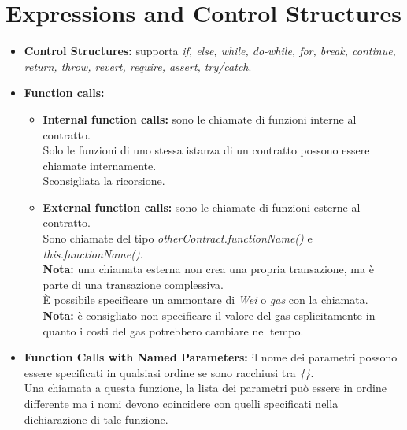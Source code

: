 \documentclass{article}
\begin{document}
            \section{Expressions and Control Structures}
                \begin{itemize}
                    \item \textbf{Control Structures:} supporta \textit{if, else, while, do-while, for, break, continue, return, throw, revert, require, assert, try/catch}.
                    
                    \item \textbf{Function calls:}
                        \begin{itemize}
                            \item \textbf{Internal function calls:} sono le chiamate di funzioni interne al contratto. \\
                            Solo le funzioni di uno stessa istanza di un contratto possono essere chiamate internamente. \\
                            Sconsigliata la ricorsione.

                            \item \textbf{External function calls:} sono le chiamate di funzioni esterne al contratto. \\
                            Sono chiamate del tipo \textit{otherContract.functionName()} e \textit{this.functionName()}. \\
                            \textbf{Nota:} una chiamata esterna non crea una propria transazione, ma è parte di una transazione complessiva. 
                            \\

                            È possibile specificare un ammontare di \textit{Wei} o \textit{gas} con la chiamata. \\
                            \textbf{Nota:} è consigliato non specificare il valore del gas esplicitamente in quanto i costi del gas potrebbero cambiare nel tempo.
                        \end{itemize}

                    \item \textbf{Function Calls with Named Parameters:} il nome dei parametri possono essere specificati in qualsiasi ordine se sono racchiusi tra \textit{\{\}}. \\ 
                    Una chiamata a questa funzione, la lista dei parametri può essere in ordine differente ma i nomi devono coincidere con quelli specificati nella dichiarazione di tale funzione.


\end{itemize}
\end{document}
